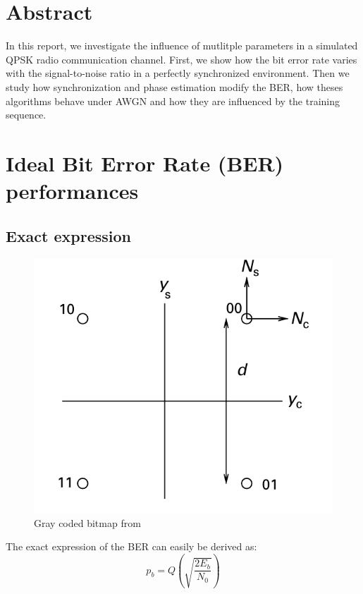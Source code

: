 \documentclass[a4paper,12pt]{article}
\begin{document}

\newpage

\section*{Abstract}
In this report, we investigate the influence of mutlitple parameters in a simulated QPSK radio communication channel.
First, we show how the bit error rate varies with the signal-to-noise ratio in a perfectly synchronized environment. Then we study how synchronization and phase estimation modify the BER, how theses algorithms behave under AWGN and how they are influenced by the training sequence.

\section{Ideal Bit Error Rate (BER) performances}

\subsection{Exact expression}
\begin{figure}[ht!]
\centering
\begin{center}
\includegraphics[scale=0.20]{Gray_coded_QPSK.png}
\caption{Gray coded bitmap from \cite{Madhow}}
\end{center}
\end{figure}
The exact expression of the BER can easily be derived as:
\begin{equation}
p_{b}=Q(\sqrt{\frac{2E_{b}}{N_{0}}})
\end{equation}
\end{document}
